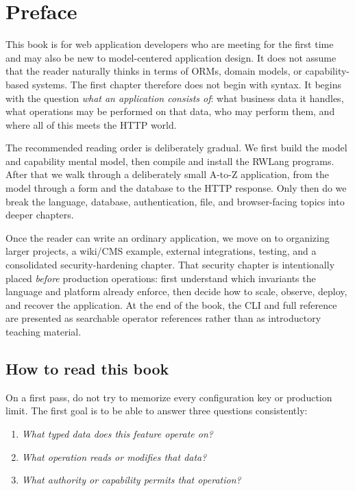 \chapter*{Preface}

This book is for web application developers who are meeting \rwlang{} for the first time and may also be new to model-centered application design. It does not assume that the reader naturally thinks in terms of ORMs, domain models, or capability-based systems. The first chapter therefore does not begin with syntax. It begins with the question \emph{what an application consists of}: what business data it handles, what operations may be performed on that data, who may perform them, and where all of this meets the HTTP world.

The recommended reading order is deliberately gradual. We first build the model and capability mental model, then compile and install the RWLang programs. After that we walk through a deliberately small A-to-Z application, from the model through a form and the database to the HTTP response. Only then do we break the language, database, authentication, file, and browser-facing topics into deeper chapters.

Once the reader can write an ordinary application, we move on to organizing larger projects, a wiki/CMS example, external integrations, testing, and a consolidated security-hardening chapter. That security chapter is intentionally placed \emph{before} production operations: first understand which invariants the language and platform already enforce, then decide how to scale, observe, deploy, and recover the application. At the end of the book, the CLI and full  reference are presented as searchable operator references rather than as introductory teaching material.

\section*{How to read this book}

On a first pass, do not try to memorize every configuration key or production limit. The first goal is to be able to answer three questions consistently:

\begin{enumerate}
  \item \emph{What typed data does this feature operate on?}
  \item \emph{What operation reads or modifies that data?}
  \item \emph{What authority or capability permits that operation?}
\end{enumerate}

